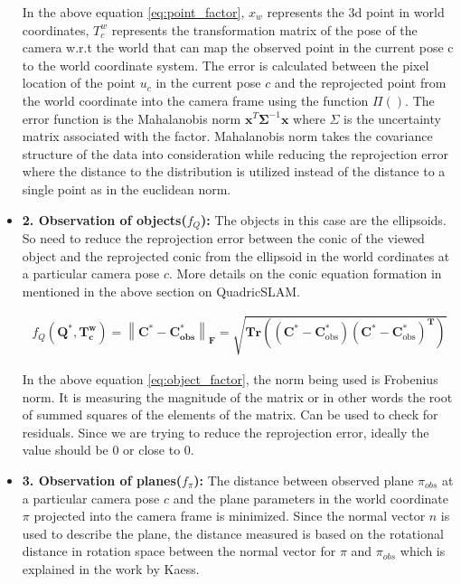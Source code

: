 \documentclass[report.tex]{subfiles}
\begin{document}
\begin{itemize}
In the above equation \ref{eq:point_factor}, $x_{w}$ represents the 3d point in world coordinates, $T_{c}^{w}$ represents the transformation matrix of the pose of the camera w.r.t the world that can map the observed point in the current pose c to the world coordinate system. The error is calculated between the pixel location of the point $u_{c}$ in the current pose $c$ and the reprojected point from the world coordinate into the camera frame using the function $\Pi()$. The error function is the Mahalanobis norm $\mathbf{x}^{T} \boldsymbol{\Sigma}^{-1} \mathbf{x}$ where $\Sigma$ is the uncertainty matrix associated with the factor. Mahalanobis norm takes the covariance structure of the data into consideration while reducing the reprojection error where the distance to the distribution is utilized instead of the distance to a single point as in the euclidean norm.

\item \textbf{2. Observation of objects($f_{Q}$): } The objects in this case are the ellipsoids. So need to reduce the reprojection error between the conic of the viewed object and the reprojected conic from the ellipsoid in the world cordinates at a particular camera pose $c$. More details on the conic equation formation in mentioned in the above section on QuadricSLAM.

\begin{equation}
{
\begin{aligned}
f_{Q}\left(\mathbf{Q}^{*}, \mathbf{T}_{\mathbf{c}}^{\mathbf{w}}\right)=\left\|\mathbf{C}^{*}-\mathbf{C}_{\mathbf{o b s}}^{*}\right\|_{\mathbf{F}}=\sqrt{\mathbf{T r}\left(\left(\mathbf{C}^{*}-\mathbf{C}_{\mathrm{obs}}^{*}\right)\left(\mathbf{C}^{*}-\mathbf{C}_{\mathrm{obs}}^{*}\right)^{\mathbf{T}}\right)}
\end{aligned}
} \label{eq:object_factor}
\end{equation}

In the above equation \ref{eq:object_factor}, the norm being used is Frobenius norm. It is measuring the magnitude of the matrix or in other words the root of summed squares of the elements of the matrix. Can be used to check for residuals. Since we are trying to reduce the reprojection error, ideally the value should be 0 or close to 0.

\item \textbf{3. Observation of planes($f_{\pi}$): } The distance between observed plane $\pi_{obs}$ at a particular camera pose $c$ and the plane parameters in the world coordinate $\pi$ projected into the camera frame is minimized. Since the normal vector $n$ is used to describe the plane, the distance measured is based on the rotational distance in rotation space between the normal vector for $\pi$ and $\pi_{obs}$ which is explained in the work by Kaess\cite{infiniteplanes}.


\end{itemize}
\end{document}
